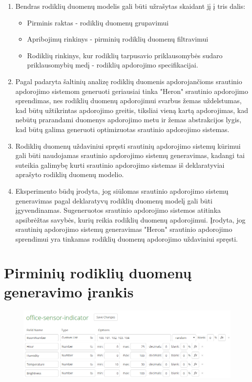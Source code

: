 \documentclass{VUMIFPSbakalaurinis}
\begin{document}
\begin{enumerate}
    \item Bendras rodiklių duomenų modelis gali būti užrašytas skaidant jį į tris dalis:
    \begin{itemize}
        \item Pirminis raktas - rodiklių duomenų grupavimui
        \item Apribojimų rinkinys - pirminių rodiklių duomenų filtravimui
        \item Rodiklių rinkinys, kur rodiklių tarpusavio priklausomybės sudaro priklausomybių medį - rodiklių apdorojimo specifikacijai.
    \end{itemize}
    \item Pagal padaryta šaltinių analizę rodiklių duomenis apdorojančioms srautinio apdorojimo sistemom generuoti geriausiai tinka "Heron" srautinio apdorojimo sprendimas, nes rodiklių duomenų apdorojimui svarbus žemas uždelstumas, kad būtų užtikrintas apdorojimo greitis, tiksliai vieną kartą apdorojimas, kad nebūtų prarandami duomenys apdorojimo metu ir žemas abstrakcijos lygis, kad būtų galima generuoti optimizuotas srautinio apdorojimo sistemas.
    \item Rodiklių duomenų uždaviniui spręsti srautinių apdorojimo sistemų kūrimui gali būti naudojamas srautinio apdorojimo sistemų generavimas, kadangi tai suteikia galimybę kurti srautinio apdorojimo sistemas iš deklaratyviai aprašyto rodiklių duomenų modelio.
    \item Eksperimento būdų įrodyta, jog siūlomas srautinio apdorojimo sistemų generavimas pagal deklaratyvų rodiklių duomenų modelį gali būti įgyvendinamas. Sugeneruotos srautinio apdorojimo sistemos atitinka apsibrėžtas savybės, kurių reikia rodiklių duomenų apdorojimui. Įrodyta, jog srautinių apdorojimo sistemų generavimas "Heron" srautinio apdorojimo sprendimui yra tinkamas rodiklių duomenų apdorojimo uždaviniui spręsti.  
\end{enumerate}

\printbibliography[heading=bibintoc] 

\appendix 

\section{Pirminių rodiklių duomenų generavimo įrankis}\label{add:mockaroo}
\begin{figure}[H]
    \centering
    \includegraphics[width=1\textwidth]{img/generated-data.png}
    \label{img:generated-data}
\end{figure}
\end{document}
